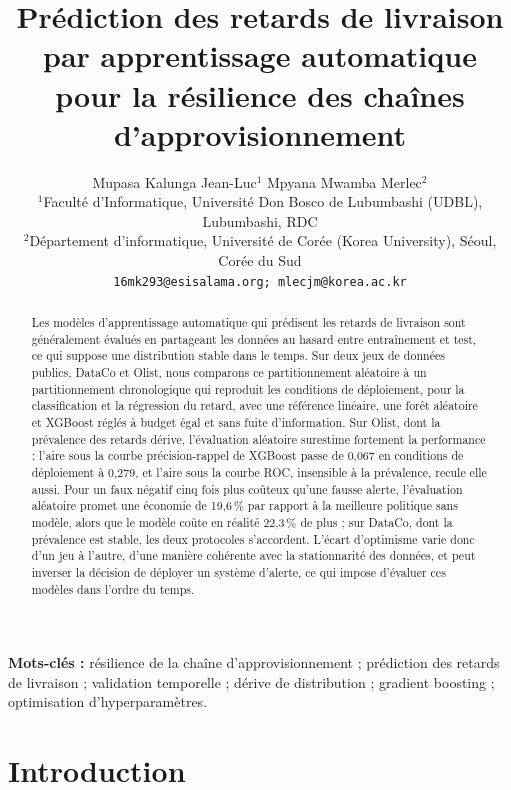 \documentclass[11pt,a4paper]{article}
\title{\textbf{Prédiction des retards de livraison par apprentissage automatique pour la résilience des chaînes d'approvisionnement}}
\author{%
\begin{tabular}{c}
Mupasa Kalunga Jean-Luc$^{1}$ \qquad Mpyana Mwamba Merlec$^{2}$\\[0.5em]
{\small $^{1}$Faculté d'Informatique, Université Don Bosco de Lubumbashi (UDBL), Lubumbashi, RDC}\\
{\small $^{2}$Département d'informatique, Université de Corée (Korea University), Séoul, Corée du Sud}\\[0.3em]
{\small\texttt{16mk293@esisalama.org; mlecjm@korea.ac.kr}}
\end{tabular}%
}
\date{} %
\theoremstyle{definition}
\begin{document}
\maketitle

\begin{abstract}
Les modèles d'apprentissage automatique qui prédisent les retards de livraison sont généralement évalués en partageant les données au hasard entre entraînement et test, ce qui suppose une distribution stable dans le temps. Sur deux jeux de données publics, DataCo et Olist, nous comparons ce partitionnement aléatoire à un partitionnement chronologique qui reproduit les conditions de déploiement, pour la classification et la régression du retard, avec une référence linéaire, une forêt aléatoire et XGBoost réglés à budget égal et sans fuite d'information. Sur Olist, dont la prévalence des retards dérive, l'évaluation aléatoire surestime fortement la performance : l'aire sous la courbe précision-rappel de XGBoost passe de 0,067 en conditions de déploiement à 0,279, et l'aire sous la courbe ROC, insensible à la prévalence, recule elle aussi. Pour un faux négatif cinq fois plus coûteux qu'une fausse alerte, l'évaluation aléatoire promet une économie de 19,6\,\% par rapport à la meilleure politique sans modèle, alors que le modèle coûte en réalité 22,3\,\% de plus ; sur DataCo, dont la prévalence est stable, les deux protocoles s'accordent. L'écart d'optimisme varie donc d'un jeu à l'autre, d'une manière cohérente avec la stationnarité des données, et peut inverser la décision de déployer un système d'alerte, ce qui impose d'évaluer ces modèles dans l'ordre du temps.
\end{abstract}

\noindent\textbf{Mots-clés :} résilience de la chaîne d'approvisionnement ; prédiction des retards de livraison ; validation temporelle ; dérive de distribution ; gradient boosting ; optimisation d'hyperparamètres.

\section{Introduction}
\label{sec:intro}
\end{document}
